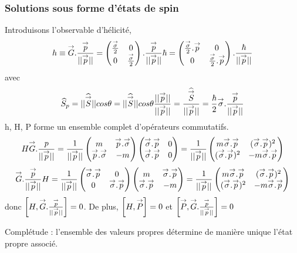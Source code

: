 \subsubsection{Solutions sous forme d’états de spin}
Introduisons l’observable d’hélicité,
\[
h\equiv\mv{G}.\frac{\mv{p}}{||\mv{p}||}=\begin{pmatrix}\frac{\mv{\s}}{2}&0\\
0&\frac{\mv{\s}}{2}\end{pmatrix}.\frac{\mv{p}}{||\mv{p}||}\hbar =
\begin{pmatrix}\frac{\mv{\s}}{2}.\mv{p}&0\\
0&\frac{\mv{\s}}{2}.\mv{p}\end{pmatrix}.\frac{\hbar}{||\mv{p}||}
\]
avec
\[
\wt{S}_p=||\wt{\mv{S}}||cos\theta=||\wt{\mv{S}}||cos\theta\frac{||\mv{p}||}{||\mv{p}||}
=\frac{\wt{\mv{S}}}{||\mv{p}||}=\frac{\hbar}{2}\mv{\s}.\frac{\mv{p}}{||\mv{p}||}
\]
{h, H, P} forme un ensemble complet d’opérateurs commutatifs.
\[
H\mv{G}.\frac{p}{||\mv{p}||}=\frac{1}{||\mv{p}||}
\begin{pmatrix}m&\mv{p}.\mv{\s}\\\mv{p}.\mv{\s}&-m\end{pmatrix}
\begin{pmatrix}\mv{\s}.\mv{p}&0\\\mv{\s}.\mv{p}&0\end{pmatrix}=\frac{1}{||\mv{p}||}
\begin{pmatrix}m\mv{\s}.\mv{p}&(\mv{\s}.\mv{p})^2\\
(\mv{\s}.\mv{p})^2&-m\mv{\s}.\mv{p}\end{pmatrix}
\]
\[
\mv{G}.\frac{\mv{p}}{||\mv{p}||}H=\frac{1}{||\mv{p}||}
\begin{pmatrix}\mv{\s}.\mv{p}&0\\0&\mv{\s}.\mv{p}\end{pmatrix}
\begin{pmatrix}m&\mv{\s}.\mv{p}\\\mv{\s}.\mv{p}&-m\end{pmatrix}
=\frac{1}{||\mv{p}||}
\begin{pmatrix}m\mv{\s}.\mv{p}&(\mv{\s}.\mv{p})^2\\
(\mv{\s}.\mv{p})^2&-m\mv{\s}.\mv{p}\end{pmatrix}
\]
donc $\left[H,\mv{G}.\frac{\mv{p}}{||\mv{p}||}\right]=0$. De plus, 
$\left[H,\mv{P}\right]=0$ et $\left[\mv{P},\mv{G}.\frac{\mv{p}}{||\mv{p}||}\right]=0$

Complétude : l'ensemble des valeurs propres détermine de manière unique l'état
propre associé.

